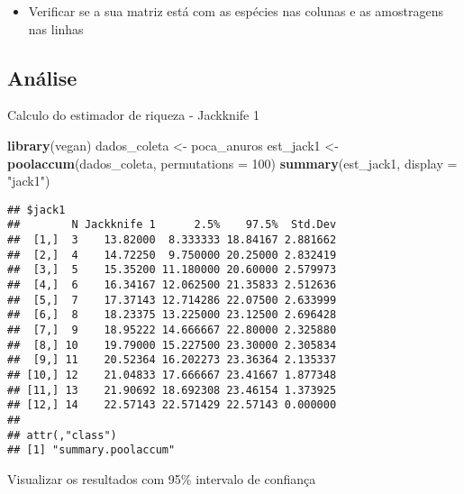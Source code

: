 \documentclass[
]{book}
\newenvironment{Shaded}{\begin{snugshade}}{\end{snugshade}}
\newcommand{\DataTypeTok}[1]{\textcolor[rgb]{0.13,0.29,0.53}{#1}}
\newcommand{\DecValTok}[1]{\textcolor[rgb]{0.00,0.00,0.81}{#1}}
\newcommand{\KeywordTok}[1]{\textcolor[rgb]{0.13,0.29,0.53}{\textbf{#1}}}
\newcommand{\NormalTok}[1]{#1}
\newcommand{\StringTok}[1]{\textcolor[rgb]{0.31,0.60,0.02}{#1}}
\providecommand{\tightlist}{%
  \setlength{\itemsep}{0pt}\setlength{\parskip}{0pt}}
\begin{document}
\begin{itemize}
\tightlist
\item
  Verificar se a sua matriz está com as espécies nas colunas e as amostragens nas linhas
\end{itemize}

\hypertarget{anuxe1lise-5}{%
\subsection{Análise}\label{anuxe1lise-5}}

Calculo do estimador de riqueza - Jackknife 1

\begin{Shaded}
\begin{Highlighting}[]
\KeywordTok{library}\NormalTok{(vegan)}
\NormalTok{dados_coleta <-}\StringTok{ }\NormalTok{poca_anuros}
\NormalTok{est_jack1 <-}\StringTok{ }\KeywordTok{poolaccum}\NormalTok{(dados_coleta, }\DataTypeTok{permutations =} \DecValTok{100}\NormalTok{)}
\KeywordTok{summary}\NormalTok{(est_jack1, }\DataTypeTok{display =} \StringTok{"jack1"}\NormalTok{)}
\end{Highlighting}
\end{Shaded}

\begin{verbatim}
## $jack1
##        N Jackknife 1      2.5%    97.5%  Std.Dev
##  [1,]  3    13.82000  8.333333 18.84167 2.881662
##  [2,]  4    14.72250  9.750000 20.25000 2.832419
##  [3,]  5    15.35200 11.180000 20.60000 2.579973
##  [4,]  6    16.34167 12.062500 21.35833 2.512636
##  [5,]  7    17.37143 12.714286 22.07500 2.633999
##  [6,]  8    18.23375 13.225000 23.12500 2.696428
##  [7,]  9    18.95222 14.666667 22.80000 2.325880
##  [8,] 10    19.79000 15.227500 23.30000 2.305834
##  [9,] 11    20.52364 16.202273 23.36364 2.135337
## [10,] 12    21.04833 17.666667 23.41667 1.877348
## [11,] 13    21.90692 18.692308 23.46154 1.373925
## [12,] 14    22.57143 22.571429 22.57143 0.000000
## 
## attr(,"class")
## [1] "summary.poolaccum"
\end{verbatim}

Visualizar os resultados com 95\% intervalo de confiança
\end{document}
